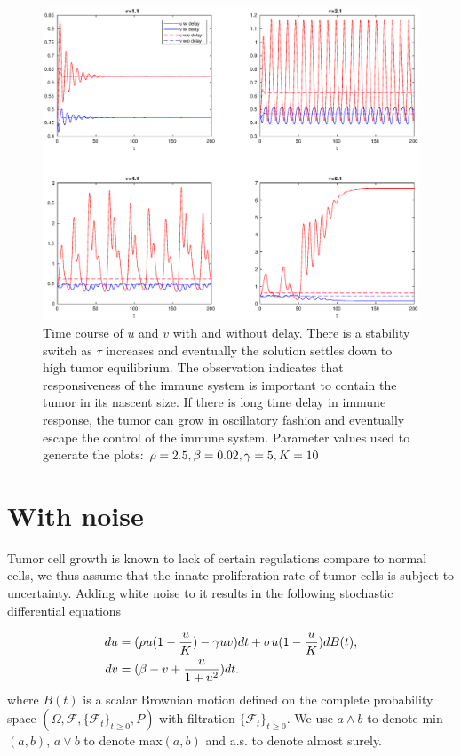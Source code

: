 \documentclass{aims}
\theoremstyle{definition}
\begin{document}
\begin{figure}[tph]
\includegraphics[viewport=70bp 0bp 947bp 818bp,scale=0.4]{explore/plots/varytau/combine}

\caption{\label{fig:stablity switch and shift} Time course of $u$ and $v$ with and without delay.
There is a stability switch as $\tau$ increases and eventually the
solution settles down to high tumor equilibrium. The observation indicates that responsiveness of the immune system is important to contain the tumor in its nascent size. If there is long time delay in immune response, the tumor can grow in oscillatory fashion and eventually escape the control of the immune system.  Parameter values
used to generate the plots: $\rho=2.5,\text{\ensuremath{\beta=0.02,\gamma=5,K=10}}$  }

\end{figure}

% 
 \section{With noise}
 
 Tumor cell growth is known to lack of certain regulations compare to normal cells, we thus assume that the innate proliferation rate of tumor cells is subject to uncertainty. Adding white noise to it results
 in the following stochastic differential equations
 
 \begin{subequations}\label{eq:sde}
 \begin{align}
 du & =(\text{\ensuremath{\rho u(1-\frac{u}{K})-\gamma uv)dt+\sigma u(1-\frac{u}{K})dB(t)}},\\
 dv & =(\beta-v+\frac{u}{1+u^{2}})dt.
 \end{align}
 \end{subequations}where $B(t)$ is a scalar Brownian motion defined
 on the complete probability space $(\Omega,\mathcal{F},\{\mathcal{F}_{t}\}_{t\ge0},P)$
 with filtration $\{\mathcal{F}_{t}\}_{t\ge0}$. We use $a\land b$
 to denote min$(a,b)$, $a \lor b$ to denote max$(a,b)$ and a.s. to denote almost surely. 
 
\end{document}
